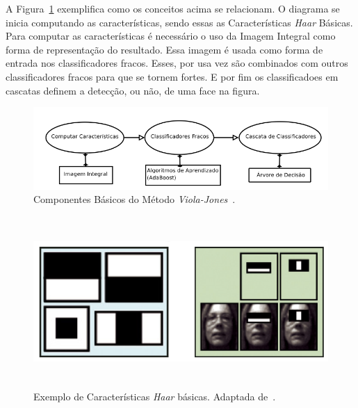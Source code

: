 	A Figura~\ref{fig:edsonma} exemplifica como os conceitos acima se relacionam.
	O diagrama se inicia computando as características, sendo essas as
	Características \textit{Haar} Básicas. Para computar as características é
	necessário o uso da Imagem Integral como forma de representação do resultado.
	Essa imagem é usada como forma de entrada nos classificadores fracos. Esses,
	por usa vez são combinados com outros classificadores fracos para que se tornem
	 fortes. E por fim os classificadoes em cascatas 
	definem a detecção, ou não, de uma face na figura.

	\begin{figure}[H]
		\begin{center}
			\includegraphics[scale=0.5]{figuras/2.FundamentacaoTeorica/edsonma.png}
		\end{center}
		\caption{Componentes Básicos do Método \textit{Viola-Jones}~\cite{edsonma}.}
		\label{fig:edsonma}
	\end{figure}

	\begin{figure}[H]
		\begin{center}
			\includegraphics[height=6.5cm,width=12.5cm]{figuras/2.FundamentacaoTeorica/haar_features.png}
		\end{center}
		\caption{Exemplo de Características \textit{Haar} básicas. Adaptada de~\cite{servodetection}.}
		\label{haarfeatures}
	\end{figure}

